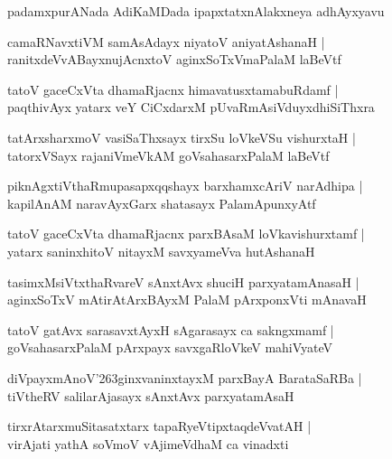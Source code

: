 \documentclass[twoside,12pt,openright]{book}
\def\S{\char'263}
\newcounter{shloka}[chapter]
\begin{document}
\begin{center}
padamxpurANada AdiKaMDada ipapxtatxnAlakxneya adhAyxyavu
\end{center}

\begin{shloka}
camaRNavxtiVM samAsAdayx niyatoV aniyatAshanaH |\\
ranitxdeVvABayxnujAcnxtoV aginxSoTxVmaPalaM laBeVtf 
\end{shloka}

\begin{shloka}
tatoV gaceCxVta dhamaRjacnx himavatusxtamabuRdamf |\\
paqthivAyx yatarx veY CiCxdarxM pUvaRmAsiVduyxdhiSiThxra 
\end{shloka}

\begin{shloka}
tatArxsharxmoV vasiSaThxsayx tirxSu loVkeVSu vishurxtaH |\\
tatorxVSayx rajaniVmeVkAM goVsahasarxPalaM laBeVtf
\end{shloka}

\begin{shloka}
piknAgxtiVthaRmupasapxqqshayx barxhamxcAriV narAdhipa |\\
kapilAnAM naravAyxGarx shatasayx PalamApunxyAtf 
\end{shloka}

\begin{shloka}
tatoV gaceCxVta dhamaRjacnx parxBAsaM loVkavishurxtamf |\\
yatarx saninxhitoV nitayxM savxyameVva hutAshanaH
\end{shloka}

\begin{shloka}
tasimxMsiVtxthaRvareV sAnxtAvx shuciH parxyatamAnasaH |\\
aginxSoTxV mAtirAtArxBAyxM PalaM pArxponxVti mAnavaH 
\end{shloka}

\begin{shloka}
tatoV gatAvx sarasavxtAyxH sAgarasayx ca sakngxmamf |\\
goVsahasarxPalaM pArxpayx savxgaRloVkeV mahiVyateV 
\end{shloka}

\begin{shloka}
diVpayxmAnoV\S ginxvaninxtayxM parxBayA BarataSaRBa |\\
tiVtheRV salilarAjasayx sAnxtAvx parxyatamAsaH 
\end{shloka}

\begin{shloka}
tirxrAtarxmuSitasatxtarx tapaRyeVtipxtaqdeVvatAH |\\
virAjati yathA soVmoV vAjimeVdhaM ca vinadxti 
\end{shloka}
\end{document}
